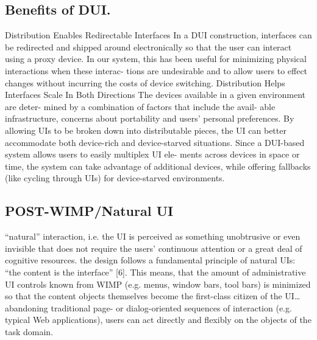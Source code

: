 \subsection{Benefits of DUI.} \cite{chen2011distributed}
Distribution Enables Redirectable Interfaces
In a DUI construction, interfaces can be redirected and shipped around electronically so that the user can interact using a proxy device. In our system, this has been useful for minimizing physical interactions when these interac- tions are undesirable and to allow users to effect changes without incurring the costs of device switching.
Distribution Helps Interfaces Scale In Both Directions
The devices available in a given environment are deter- mined by a combination
of factors that include the avail- able infrastructure, concerns about
portability and users' personal preferences. By allowing UIs to be broken down into distributable pieces, the UI can better accommodate both device-rich and device-starved situations. Since a DUI-based system allows users to easily multiplex UI ele- ments across devices in space or time, the system can take advantage of additional devices, while offering fallbacks (like cycling through UIs) for device-starved environments.\\

\subsection{POST-WIMP/Natural UI}
\cite{seifried2011lessons} “natural” interaction, i.e. the UI is perceived as
something unobtrusive or even invisible that does not require the users’
continuous attention or a great deal of cognitive resources. the design follows
a fundamental principle of natural UIs: “the content is the interface” [6]. This means, that the amount of administrative UI controls known
from WIMP (e.g. menus, window bars, tool bars) is minimized so that the content
objects themselves become the first-class citizen of the UI\ldots abandoning
traditional page- or dialog-oriented sequences of interaction (e.g. typical Web
applications), users can act directly and flexibly on the objects of the task
domain.\\


